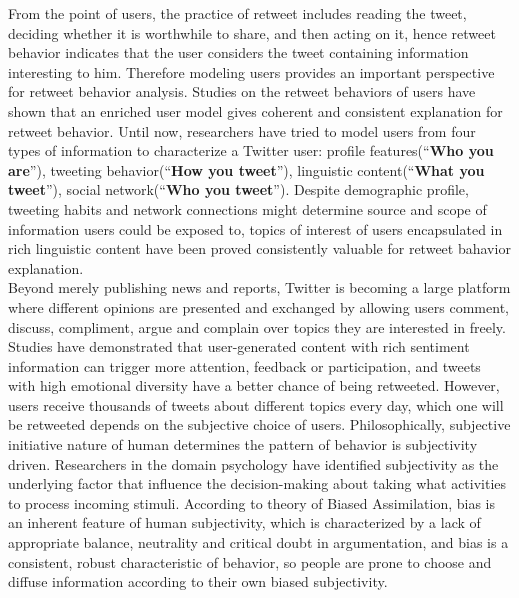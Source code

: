 \documentclass{acm_proc_article-sp}
\begin{document}
From the point of users, the practice of retweet includes reading the tweet, deciding whether it is worthwhile to share, and then acting on it, hence retweet behavior indicates that the user considers the tweet containing information interesting to him.
Therefore modeling users provides an important perspective for retweet behavior analysis.
Studies on the retweet behaviors of users have shown that an enriched user model gives coherent and consistent explanation for retweet behavior\cite{Abel:2011AUM,conf/icwsm/MacskassyM11,conf/wsdm/FengW13}. 
Until now, researchers have tried to model users from four types of information to characterize a Twitter user:
profile features(“\textbf{Who you are}”), tweeting behavior(“\textbf{How you tweet}”), linguistic content(“\textbf{What you tweet}”), 
social network(“\textbf{Who you tweet}”)\cite{Pennacchiotti:icwsm11}. 
Despite demographic profile, tweeting habits and network connections might determine source and scope of information users could be exposed to, topics of interest of users encapsulated in rich linguistic content have been proved consistently valuable for retweet bahavior explanation\cite{conf/icwsm/MacskassyM11}.\\
Beyond merely publishing news and reports, Twitter is becoming a large platform where different opinions are presented and exchanged by allowing users comment, discuss, compliment, argue and complain over topics they are interested in freely. 
Studies have demonstrated that user-generated content with rich sentiment information can trigger more attention, feedback or participation\cite{DBLP:conf/hicss/StieglitzD12}, and tweets with high emotional diversity have a better chance of being retweeted\cite{conf/icwsm/PfitznerGS12}.
However, users receive thousands of tweets about different topics every day, which one will be retweeted depends on the subjective choice of users.
Philosophically, subjective initiative nature of human determines the pattern of behavior is subjectivity driven.
Researchers in the domain psychology have identified subjectivity as the underlying factor that influence the decision-making about taking what activities to process incoming stimuli\cite{Moore2008,Haggard2002a}.
According to theory of Biased Assimilation, bias is an inherent feature of human subjectivity, which is characterized by a lack of appropriate balance, neutrality and critical doubt in argumentation, and bias is a consistent, robust characteristic of behavior, so people are prone to choose and diffuse information according to their own biased subjectivity\cite{Hyman2000,sunstein2009rumors}.
\end{document}
